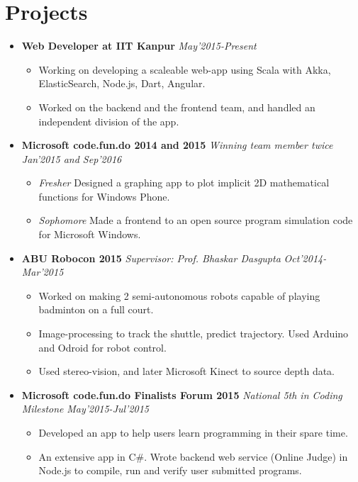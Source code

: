 \documentclass[11pt,a4paper]{article}
\begin{document}
\section*{Projects}
\vspace{-0.2cm}
\begin{itemize}

\item \textbf{\large{Web Developer at IIT Kanpur}} \hfill\textit{May'2015-Present}
  \begin{itemize}[leftmargin=*]
    \setlength\itemsep{0em}
    \item Working on developing a scaleable web-app using Scala with Akka, ElasticSearch, Node.js, Dart, Angular.
    \item Worked on the backend and the frontend team, and handled an independent division of the app.
  \end{itemize}

\vspace{0.1cm}
\item \textbf{\large{Microsoft code.fun.do 2014 and 2015}} \emph{Winning team member twice} \hfill\textit{Jan'2015 and Sep'2016}
  \begin{itemize}[leftmargin=*]
    \setlength\itemsep{0em}
    \item \textit{Fresher} Designed a graphing app to plot implicit 2D mathematical functions for Windows Phone.
    \item \textit{Sophomore} Made a frontend to an open source program simulation code for Microsoft Windows.
    \end{itemize}

\vspace{0.1cm}
\item \textbf{\large{ABU Robocon 2015}} \emph{Supervisor: Prof. Bhaskar Dasgupta} \hfill\textit{Oct'2014-Mar'2015}
  \begin{itemize}[leftmargin=*]
    \setlength\itemsep{0em}
    \item Worked on making 2 semi-autonomous robots capable of playing badminton on a full court.
    \item Image-processing to track the shuttle, predict trajectory. Used Arduino and Odroid for robot control.
    \item Used stereo-vision, and later Microsoft Kinect to source depth data.
    \end{itemize}

\vspace{0.1cm}
\item \textbf{\large{Microsoft code.fun.do Finalists Forum 2015}} \emph{National 5th in Coding Milestone} \hfill\textit{May'2015-Jul'2015}
  \begin{itemize}[leftmargin=*]
    \setlength\itemsep{0em}
    \item Developed an app to help users learn programming in their spare time.
    \item An extensive app in C\#. Wrote backend web service (Online Judge) in Node.js to compile, run and verify user submitted programs.
    \end{itemize}
\end{itemize}
\end{document}
